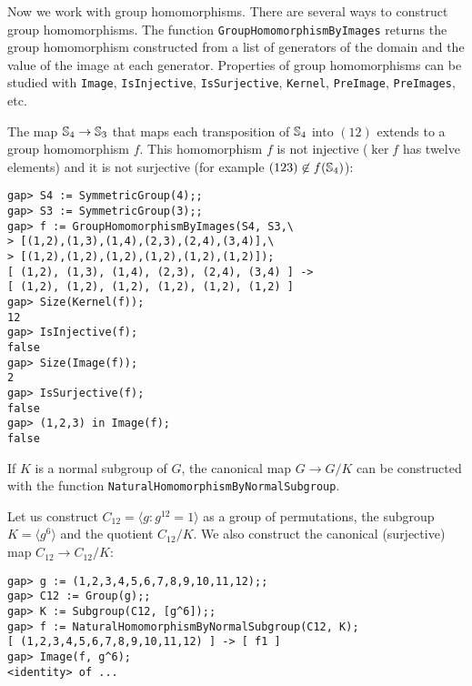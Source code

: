 Now we work with group homomorphisms. There are several ways to construct group homomorphisms. The function
\lstinline{GroupHomomorphismByImages} returns the group homomorphism
constructed from a list of generators of the domain and the value of the image
at each generator. Properties of group homomorphisms can be studied with
\lstinline{Image}, \lstinline{IsInjective}, \lstinline{IsSurjective},
\lstinline{Kernel}, \lstinline{PreImage}, \lstinline{PreImages}, etc. 

\begin{example}
The map $\mathbb{S}_4\to\mathbb{S}_3$
that maps each transposition of $\mathbb{S}_4$ into $(12)$ extends to a group homomorphism $f$. 
This homomorphism $f$ is not injective ($\ker f$ has twelve elements) and it is
not surjective (for example $(123)\not\in f(\mathbb{S}_4)$):
\begin{lstlisting}
gap> S4 := SymmetricGroup(4);;
gap> S3 := SymmetricGroup(3);;
gap> f := GroupHomomorphismByImages(S4, S3,\
> [(1,2),(1,3),(1,4),(2,3),(2,4),(3,4)],\
> [(1,2),(1,2),(1,2),(1,2),(1,2),(1,2)]);
[ (1,2), (1,3), (1,4), (2,3), (2,4), (3,4) ] -> 
[ (1,2), (1,2), (1,2), (1,2), (1,2), (1,2) ]
gap> Size(Kernel(f));
12
gap> IsInjective(f);
false
gap> Size(Image(f));
2
gap> IsSurjective(f);
false
gap> (1,2,3) in Image(f);
false
\end{lstlisting}
\end{example}

If $K$ is a normal subgroup of $G$, the canonical map $G\to G/K$ can be
constructed with the function \lstinline{NaturalHomomorphismByNormalSubgroup}.

\begin{example}
Let us construct $C_{12}=\langle g:g^{12}=1\rangle$ as a group of permutations,
the subgroup $K=\langle g^6\rangle$ and the quotient  $C_{12}/K$. 
We also construct the canonical (surjective) map $C_{12}\to C_{12}/K$: 
\begin{lstlisting}
gap> g := (1,2,3,4,5,6,7,8,9,10,11,12);;
gap> C12 := Group(g);;
gap> K := Subgroup(C12, [g^6]);;
gap> f := NaturalHomomorphismByNormalSubgroup(C12, K);
[ (1,2,3,4,5,6,7,8,9,10,11,12) ] -> [ f1 ]		
gap> Image(f, g^6);
<identity> of ...
\end{lstlisting}
\end{example}

